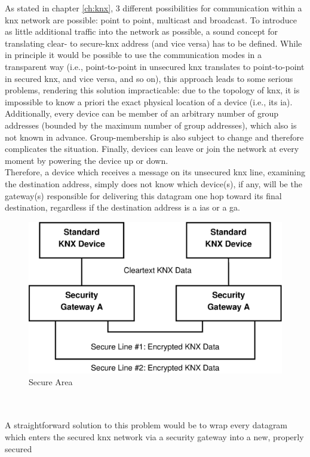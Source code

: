 As stated in chapter \ref{ch:knx}, 3 different possibilities for communication within a \gls{knx} network are possible: point to point, multicast and broadcast.
To introduce as little additional traffic into the network as possible, a sound concept for translating clear- to secure-\gls{knx} address (and vice versa) has to
be defined. While in principle it would be possible to use the communication modes in a transparent way (i.e., point-to-point in unsecured \gls{knx} translates
to point-to-point in secured \gls{knx}, and vice versa, and so on), this approach leads to some serious problems, rendering this solution impracticable:
due to the topology of \gls{knx}, it is impossible to know a priori the exact physical location of a device (i.e., its \gls{ia}). Additionally,
every device can be member of an arbitrary number of group addresses (bounded by the maximum number of group addresses), which also is not known in advance.
Group-membership is also subject to change and therefore complicates the situation. Finally, devices can leave or join the network at every moment by powering the
device up or down.
\\
Therefore, a device which receives a message on its unsecured \gls{knx} line, examining the destination address, simply does
not know which device(s), if any, will be the gateway(s) responsible for delivering this datagram one hop toward its final destination,
regardless if the destination address is a \glspl{ia} or a \gls{ga}.
\begin{figure}
    \centering
    \includegraphics[width=1\textwidth]{figures/SecureArea.eps}
    \caption{Secure Area}
    \label{fig:secArea}
\end{figure}
\\
\\
A straightforward solution to this problem would be to wrap every datagram which enters the secured \gls{knx} network via a security gateway into a new, properly secured
